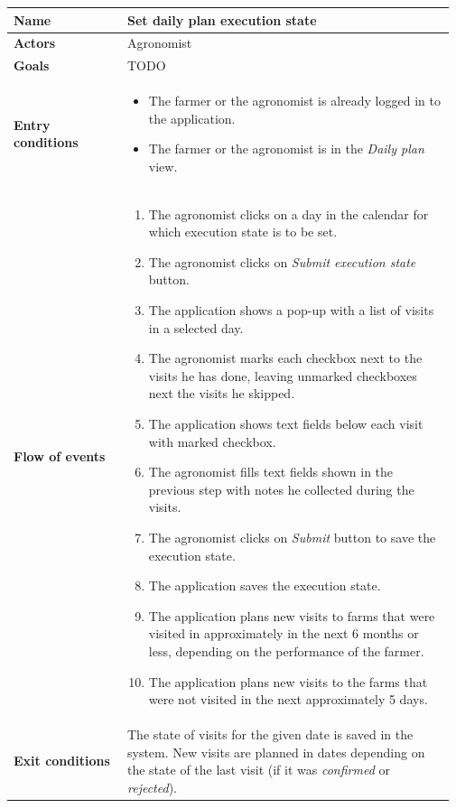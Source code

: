 \begin{table}[H]
    \centering
	\begin{tabular}{@{}p{0.25\linewidth} p{0.72\linewidth}@{}}
		\toprule
		\textbf{Name}               & Set daily plan execution state \\
		\midrule
		\textbf{Actors}             & Agronomist\\
		\midrule
		\textbf{Goals}              & TODO \\
		\midrule
		
		\textbf{Entry conditions}   & \begin{itemize}[leftmargin=.4cm,noitemsep,topsep=0pt,before=\vspace{-3mm},after=\vspace{-4mm}]
		    \item The farmer or the agronomist is already logged in to the application.
		    \item The farmer or the agronomist is in the \textit{Daily plan} view.
		\end{itemize}\\
		\midrule
		
		\textbf{Flow of events}     & \begin{enumerate}[leftmargin=.4cm,noitemsep,topsep=0pt,before=\vspace{-3mm},after=\vspace{-4mm}]
		    \item The agronomist clicks on a day in the calendar for which execution state is to be set.
		    \item The agronomist clicks on \textit{Submit execution state} button.
		    \item The application shows a pop-up with a list of visits in a selected day.
		    \item The agronomist marks each checkbox next to the visits he has done, leaving unmarked checkboxes next the visits he skipped.
		    \item The application shows text fields below each visit with marked checkbox.
		    \item The agronomist fills text fields shown in the previous step with notes he collected during the visits.
		    \item The agronomist clicks on \textit{Submit} button to save the execution state.
		    \item The application saves the execution state.
		    \item The application plans new visits to farms that were visited in approximately in the next 6 months or less, depending on the performance of the farmer.
		    \item The application plans new visits to the farms that were not visited in the next approximately 5 days.
		\end{enumerate}\\
		\midrule
		\textbf{Exit conditions}    & The state of visits for the given date is saved in the system. New visits are planned in dates depending on the state of the last visit (if it was \textit{confirmed} or \textit{rejected}). \\
		\midrule
		

\end{tabular}
\end{table}
